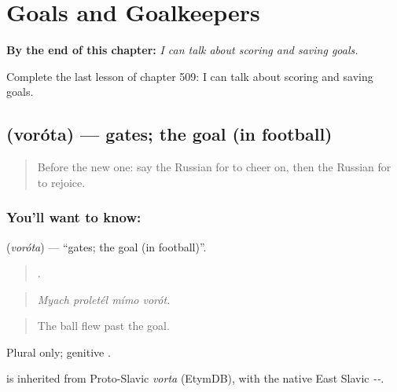 
\chapter{Goals and Goalkeepers}
\label{ch:ru-goals-and-goalkeepers}

\begin{chapteropening}
\textbf{By the end of this chapter:} \emph{I can talk about scoring and saving goals.}

Complete the last lesson of chapter 509: I can talk about scoring and saving goals.
\end{chapteropening}

\section[\texorpdfstring{\ru{ворота} (voróta)}{ворота (voróta)}]{ (voróta) — gates; the goal (in football)}

\label{lesson:RU-C509-vorota}



\begin{quote}
Before the new one: say the Russian for to cheer on, then the Russian for to rejoice.
\end{quote}

\subsection*{You'll want to know: }
\textbf{} (\emph{voróta}) — \textquotedblleft{}gates; the goal (in football)\textquotedblright{}.

\begin{quote}
   .
\end{quote}

\begin{quote}
\emph{Myach proletél mímo vorót.}
\end{quote}

\begin{quote}
The ball flew past the goal.
\end{quote}

Plural only; genitive .

\begin{cousinweb}
\emph{} is inherited from Proto-Slavic \emph{vorta} (EtymDB), with the native East Slavic \emph{--}.
\end{cousinweb}

